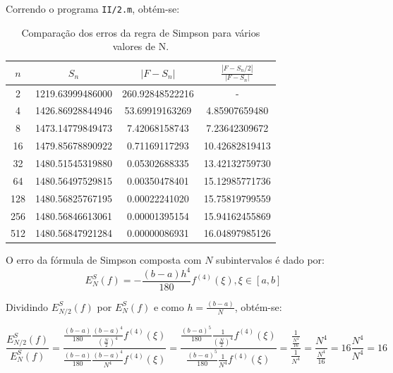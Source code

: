 \documentclass[portuguese, a4paper]{article}
\begin{document}
	\subsubsection{} \label{sec:II.2b)}
	\par
	Correndo o programa \texttt{II/2.m}, obtém-se:
	\begin{table}[H]
		\centering
		\begin{tabular}{|c|c|c|c|}
			\hline
			$n$	& $S_n$				& $|F - S_n|$		& $\frac{|F - S_n/2|}{|F - S_n|}$ \\ \hline
			2	& 1219.63999486000	& 260.92848522216	& -					\\ \hline
			4	& 1426.86928844946	& 53.69919163269	& 4.85907659480		\\ \hline
			8	& 1473.14779849473	& 7.42068158743		& 7.23642309672		\\ \hline
			16	& 1479.85678890922	& 0.71169117293		& 10.42682819413	\\ \hline
			32	& 1480.51545319880	& 0.05302688335		& 13.42132759730	\\ \hline
			64	& 1480.56497529815	& 0.00350478401		& 15.12985771736	\\ \hline
			128	& 1480.56825767195	& 0.00022241020		& 15.75819799559	\\ \hline
			256	& 1480.56846613061	& 0.00001395154		& 15.94162455869	\\ \hline
			512	& 1480.56847921284	& 0.00000086931		& 16.04897985126	\\ \hline
		\end{tabular}
		\caption{Comparação dos erros da regra de Simpson para vários valores de N.}
		\label{tab:simp}
	\end{table}
	\par
	O erro da fórmula de Simpson composta com $N$ subintervalos é dado por:
	$$E_N^S(f) = -\frac{(b - a)h^4}{180}f^{(4)}(\xi), \xi \in [a,b]$$

	\par
	Dividindo $E_{N/2}^S(f)$ por $E_N^S(f)$ e como $h = \frac{(b - a)}{N}$, obtém-se:

	$$\frac{E_{N/2}^S(f)}{E_N^S(f)} =
	\frac{\frac{(b - a)}{180}\frac{(b - a)^4}{(\frac{N}{2})^4}f^{(4)}(\xi)}
		 {\frac{(b - a)}{180}\frac{(b - a)^4}{N^4}f^{(4)}(\xi)} =
	\frac{\frac{(b - a)^5}{180}\frac{1}{(\frac{N}{2})^4}f^{(4)}(\xi)}
		 {\frac{(b - a)^5}{180}\frac{1}{N^4}f^{(4)}(\xi)} =
	\frac{\frac{1}{\frac{N^4}{16}}}{\frac{1}{N^4}} = \frac{N^4}{\frac{N^4}{16}} =
	16\frac{N^4}{N^4} = 16$$
\end{document}
